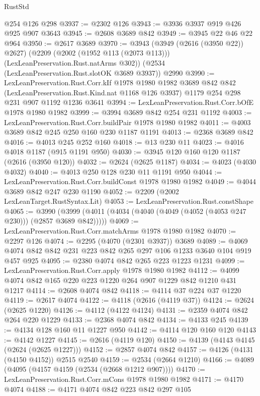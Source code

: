 \begin{lexlean}{RustStd}
\begin{coremodule}
    @254
    @126
    @298
@3937 := @2302 @126
@3943 := @3936 @3937 @919 @426 @925 @907 @3643
@3945 := @2608 @3689 @842
@3949 := @3945 @22 @46 @22 @964
@3950 := @2617 @3689
@3970 := @3943
    (@3949 (@2616 (@3950 @22)) @2627)
    (@2209 (@2002 (@1952 @113 (@2073 @113))) (LexLeanPreservation.Rust.natArms @302))
    (@2534 (LexLeanPreservation.Rust.slotOK @3689 @3937))
    @2990
@3990 := LexLeanPreservation.Rust.Corr.kIf
    @1978
    @1980
    @1982
    @3689
    @842
    @842
    (LexLeanPreservation.Rust.Kind.nat @1168 @126 @3937)
    @1179
    @254
    @298
    @231
    @907
    @1192
    @1236
    @3641
@3994 := LexLeanPreservation.Rust.Corr.bOfE @1978 @1980 @1982
@3999 := @3994 @3689 @842 @254 @231 @1192
@4003 := LexLeanPreservation.Rust.Corr.buildPair @1978 @1980 @1982
@4011 := @4003 @3689 @842 @245 @250 @160 @230 @1187 @1191
@4013 := @2368 @3689 @842
@4016 := @4013 @245 @252 @160
@4018 := @13 @230 @11
@4023 := @4016 @4018 @1187 (@915 @1191 @950)
@4030 := @3945 @120 @160 @120 @1187 (@2616 (@3950 @120))
@4032 := @2624 (@2625 @1187)
@4034 := @4023 (@4030 @4032)
@4040 := @4013 @250 @128 @230 @11 @1191 @950
@4044 := LexLeanPreservation.Rust.Corr.buildConst @1978 @1980 @1982
@4049 := @4044 @3689 @842 @247 @230 @1190
@4052 := @2209 (@2002 LexLeanTarget.RustSyntax.Lit)
@4053 := LexLeanPreservation.Rust.constShape
@4065 := @3990 (@3999 (@4011 (@4034 (@4040 (@4049 (@4052 (@4053 @247 @230))) (@2857 @3689 @842)))))
@4069 := LexLeanPreservation.Rust.Corr.matchArms @1978 @1980 @1982
@4070 := @2297 @126
@4074 := @2295 (@4070 (@2301 @3937)) @3689
@4089 := @4069 @4074 @842 @842 @231 @223 @842 @265 @297 @106 @1233 @3640 @104 @919 @457 @925
@4095 := @2380 @4074 @842 @265 @223 @1223 @1231
@4099 := LexLeanPreservation.Rust.Corr.apply @1978 @1980 @1982
@4112 := @4099 @4074 @842 @165 @220 @223 @1220 @264 @907 @1229 @842 @1210 @431 @1217
@4114 := @2608 @4074 @842
@4118 := @4114 @37 @224 @37 @1220
@4119 := @2617 @4074
@4122 := @4118 (@2616 (@4119 @37))
@4124 := @2624 (@2625 @1220)
@4126 := @4112 (@4122 @4124)
@4131 := @2359 @4074 @842 @264 @220 @1229
@4133 := @2368 @4074 @842
@4134 := @4133 @245
@4139 := @4134 @128 @160 @11 @1227 @950
@4142 := @4114 @120 @160 @120
@4143 := @4142 @1227
@4145 := @2616 (@4119 @120)
@4150 := @4139 (@4143 @4145 (@2624 (@2625 @1227)))
@4152 := @2857 @4074 @842
@4157 := @4126 (@4131 (@4150 @4152)) @2515 @2540
@4159 := @2534 (@2664 @1210)
@4166 := @4089 (@4095 (@4157 @4159 (@2534 (@2668 @1212 @907))))
@4170 := LexLeanPreservation.Rust.Corr.mCons @1978 @1980 @1982
@4171 := @4170 @4074
@4188 := @4171
    @4074
    @842
    @223
    @842
    @297
    @105

\end{coremodule}
\end{lexlean}
